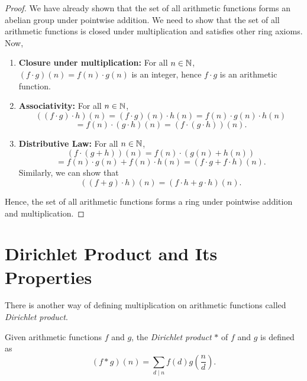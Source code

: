 \begin{proof}
    We have already shown that the set of all arithmetic functions forms an abelian group under pointwise addition.
    We need to show that the set of all arithmetic functions is closed under multiplication and satisfies other ring axioms.
    Now, 
    \begin{enumerate}
        \item \textbf{Closure under multiplication:} For all $n \in \mathbb{N}$, $(f \cdot g)(n) = f(n) \cdot g(n)$ is an integer, hence $f \cdot g$ is an arithmetic function.
        \item \textbf{Associativity:} For all $n \in \mathbb{N}$,
        \[((f \cdot g) \cdot h)(n) = (f \cdot g)(n) \cdot h(n) = f(n) \cdot g(n) \cdot h(n)\]\[= f(n) \cdot (g \cdot h)(n) = (f \cdot (g \cdot h))(n).\]
        \item \textbf{Distributive Law:} For all $n \in \mathbb{N}$,
        \[(f \cdot (g + h))(n) = f(n) \cdot (g(n) + h(n)) \]\[= f(n) \cdot g(n) + f(n) \cdot h(n) = (f \cdot g + f \cdot h)(n).\]
        Similarly, we can show that \[((f + g) \cdot h)(n) = (f \cdot h + g \cdot h)(n).\]    
    \end{enumerate}
    Hence, the set of all arithmetic functions forms a ring under pointwise addition and multiplication.
\end{proof}

\section{Dirichlet Product and Its Properties}
There is another way of defining multiplication on arithmetic functions called \textit{Dirichlet product}. 
\begin{definition}
    Given arithmetic functions $f$ and $g$, the \textit{Dirichlet product} $\ast$ of $f$ and $g$ is defined as \[(f \ast g)(n) = \sum_{d\mid n} f(d) g\left(\frac{n}{d}\right).\]
\end{definition}

